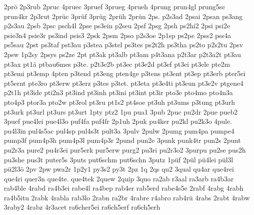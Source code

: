 {    2prö
    2p3rub
    2pruc
    4pruec
    3pruef
    3prueg
    4prueh
    4prung
    prun4gl
    prung5sc
    prun4kr
    2p3rut
    2prüc
    3prüf
    3prüg
    2prüh
    2prün
    2ps.
    p2s3ad
    2psai
    2psan
    ps3ang
    p2s3au
    2psb
    2psc
    psch4l
    2pse
    ps3ein
    p2seu
    2psf
    2psg
    2psh
    ps2hi2
    2psi
    psi2e
    psie3n4
    psie3r
    ps3ind
    psis3
    2psk
    2psm
    2pso
    p2s3oe
    2p1sp
    ps2pe
    2pss2
    pss4a
    ps5sau
    2pst
    ps3taf
    pst3au
    p3stea
    p3stel
    ps3tes
    ps2t2h
    ps3tha
    ps2to
    p2s2tu
    2psv
    2psw
    1p2sy
    2psys
    ps2ze
    2pt
    pt3ak
    pt3alb
    pt3am
    p4t3ana
    p2t3ar
    p2t3a2t
    pt3au
    pt3ax
    pt1ä
    ptbau6mes
    p3te.
    p2t3e2b
    pt3ec
    pt3e2d
    pt3ef
    pt3ei
    pt3ele
    pte2m
    pt3emi
    pt3emp
    4pten
    p3tend
    pt3eng
    pten4ge
    p3tens
    pt3ent
    pt3ep
    pt3erb
    pter5ei
    pt5ernt
    pte3ro
    pt3erw
    pt3erz
    p3tes
    p3tet.
    pt3eta
    pt3e4ti
    pt3eun
    pt3e2v
    ptgene4
    p2t1h
    pt3ide
    pti2n3
    pt3ind
    pt3inh
    pt3ini
    pt3int
    pt3ir
    pto3e
    pto4mo
    pto4n3a
    pto4p3
    ptor3a
    pto2w
    pt3rol
    pt3ru
    pt1s2
    pt4soe
    pt3uh
    pt3ums
    p3tung
    pt3urh
    pt3urk
    pt3url
    pt3urs
    pt3urt
    1pty
    ptz2
    1pu
    pua1
    3pub
    2puc
    pu2dr
    2pue
    pueb2
    3puef
    pue4lei
    pue4l3o
    puf4fa
    puf4fr
    2p1uh
    2puk
    pu4ker
    pu2kl
    pu2k3o
    4pule.
    pu4l3in
    pul4s5ac
    pul4sp
    pul4s3t
    pult3a
    3pulv
    2pulw
    2pumg
    pum4pa
    pumpe4
    pump3f
    pum4p3h
    pum4p3l
    pum4p3r
    2pund
    pun2e
    3punk
    punk4tr
    pun2s
    2punt
    pu2r3a
    pure2
    pu4r3ei
    pur5erk
    pur5erw
    purg2
    pu3ri
    pu2r3o2
    3purpu
    pu2se
    pus2h
    pu3she
    pus3t
    puter5s
    3puts
    put6schm
    put6schn
    3putz
    1püf
    2pül
    pü4lei
    pül3l
    pü2l3ö
    2pv
    2pw
    pwa2r
    1p2y1
    py3s2
    py3t
    2pz
    1q
    2qs
    qu2
    3qual
    qu4ar
    que4rei
    que4ri
    quer3n
    que4te.
    que4tek
    2quew
    2quip
    3quo
    ra2ab
    r3aal
    ra3arb
    ra4b3ar
    rab4ble
    4rabd
    ra4b3ei
    rabe4l
    ra4bep
    rab4er
    rab5erd
    rabe4s5e
    2rabf
    4rabg
    4rabh
    ra4b5itu
    2rabk
    4rabla
    rab3lo
    2rabn
    ra2br
    4rabre
    r4abro
    rab4rü
    4rabs
    2rabt
    4rabw
    3raby2
    4rabz
    4r3acet
    ra6cher5ei
    ra6ch5erf
    ra6ch5erh
}

